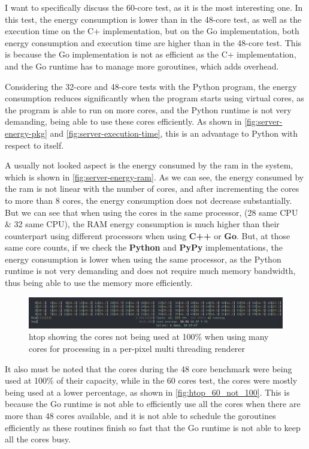 I want to specifically discuss the 60-core test, as it is the most interesting one. In this test, the energy consumption is lower than in the 48-core test, as well as the execution time on the C\++ implementation, but on the Go implementation, both energy consumption and execution time are higher than in the 48-core test. This is because the Go implementation is not as efficient as the C\++ implementation, and the Go runtime has to manage more goroutines, which adds overhead.

Considering the 32-core and 48-core tests with the Python program, the energy consumption reduces significantly when the program starts using virtual cores, as the program is able to run on more cores, and the Python runtime is not very demanding, being able to use these cores efficiently. As shown in \autoref{fig:server-energy-pkg} and \autoref{fig:server-execution-time}, this is an advantage to Python with respect to itself.


A usually not looked aspect is the energy consumed by the \gls{ram} in the system, which is shown in \autoref{fig:server-energy-ram}. As we can see, the energy consumed by the \gls{ram} is not linear with the number of cores, and after incrementing the cores to more than $8$ cores, the energy consumption does not decrease substantially. But we can see that when using the cores in the same processor, (28 same CPU \& 32 same CPU), the RAM energy consumption is much higher than their counterpart using different processors when using \textbf{C++} or \textbf{Go}. But, at those same core counts, if we check the \textbf{Python} and \textbf{PyPy} implementations, the energy consumption is lower when using the same processor, as the Python runtime is not very demanding and does not require much memory bandwidth, thus being able to use the memory more efficiently.



\begin{figure}
    \centering
    \includegraphics[width=1\linewidth]{img/htop_not_running_100_60_cores.png}
    \caption{\gls{htop} showing the cores not being used at 100\% when using many cores for processing in a per-pixel multi threading renderer }
    \label{fig:htop_60_not_100}
\end{figure}

It also must be noted that the cores during the 48 core benchmark were being used at 100\% of their capacity, while in the 60 cores test, the cores were mostly being used at a lower percentage, as shown in \autoref{fig:htop_60_not_100}. This is because the Go runtime is not able to efficiently use all the cores when there are more than 48 cores available, and it is not able to schedule the goroutines efficiently as these routines finish so fast that the Go runtime is not able to keep all the cores busy.

